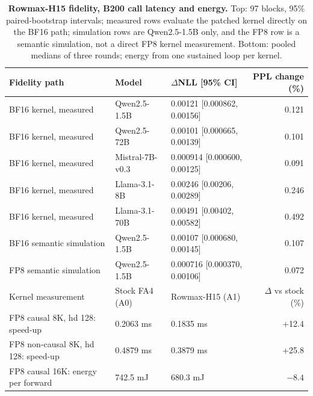 \begin{table}[t]
\centering
\footnotesize
\setlength{\tabcolsep}{3.5pt}
\renewcommand{\arraystretch}{0.86}
\caption{\textbf{Rowmax-H15 fidelity, B200 call latency and energy.}  Top: 97 blocks, 95\%
paired-bootstrap intervals; measured rows evaluate the patched kernel directly on the BF16
path; simulation rows are Qwen2.5-1.5B only, and the FP8 row is a semantic simulation, not a
direct FP8 kernel measurement.  Bottom: pooled medians of three rounds; energy from one
sustained loop per kernel.}
\label{tab:m-h15}
\begin{tabular}{@{}lllr@{}}
\toprule
Fidelity path & Model & \(\Delta\)NLL [95\% CI] & PPL change (\%) \\
\midrule
BF16 kernel, measured & Qwen2.5-1.5B & 0.00121 [0.000862, 0.00156] & 0.121 \\
BF16 kernel, measured & Qwen2.5-72B & 0.00101 [0.000665, 0.00139] & 0.101 \\
BF16 kernel, measured & Mistral-7B-v0.3 & 0.000914 [0.000600, 0.00125] & 0.091 \\
BF16 kernel, measured & Llama-3.1-8B & 0.00246 [0.00206, 0.00289] & 0.246 \\
BF16 kernel, measured & Llama-3.1-70B & 0.00491 [0.00402, 0.00582] & 0.492 \\
BF16 semantic simulation & Qwen2.5-1.5B & 0.00107 [0.000680, 0.00145] & 0.107 \\
FP8 semantic simulation & Qwen2.5-1.5B & 0.000716 [0.000370, 0.00106] & 0.072 \\
\midrule
Kernel measurement & Stock FA4 (A0) & Rowmax-H15 (A1) & \(\Delta\) vs stock (\%) \\
\midrule
FP8 causal 8K, hd 128: speed-up & 0.2063 ms & 0.1835 ms & +12.4 \\
FP8 non-causal 8K, hd 128: speed-up & 0.4879 ms & 0.3879 ms & +25.8 \\
FP8 causal 16K: energy per forward & 742.5 mJ & 680.3 mJ & \(-8.4\) \\
\bottomrule
\end{tabular}
\end{table}
